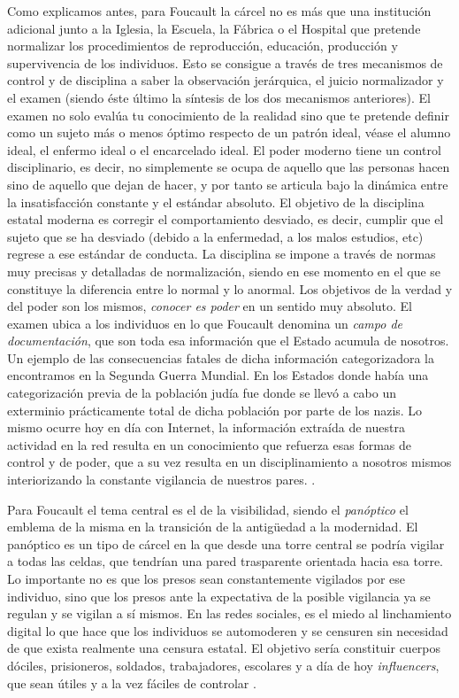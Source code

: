 \documentclass[11pt]{article}
\begin{document}
Como explicamos antes, para Foucault la cárcel no es más que una institución adicional junto a la Iglesia, la Escuela, la Fábrica o el Hospital que pretende normalizar los procedimientos de reproducción, educación, producción y supervivencia de los individuos. Esto se consigue a través de tres mecanismos de control y de disciplina a saber la observación jerárquica, el juicio normalizador y el examen (siendo éste último la síntesis de los dos mecanismos anteriores). El examen no solo evalúa tu conocimiento de la realidad sino que te pretende definir como un sujeto más o menos óptimo respecto de un patrón ideal, véase el alumno ideal, el enfermo ideal o el encarcelado ideal. El poder moderno tiene un control disciplinario, es decir, no simplemente se ocupa de aquello que las personas hacen sino de aquello que dejan de hacer, y por tanto se articula bajo la dinámica entre la insatisfacción constante y el estándar absoluto. El objetivo de la disciplina estatal moderna es corregir el comportamiento desviado, es decir, cumplir que el sujeto que se ha desviado (debido a la enfermedad, a los malos estudios, etc) regrese a ese estándar de conducta. La disciplina se impone a través de normas muy precisas y detalladas de normalización, siendo en ese momento en el que se constituye la diferencia entre lo normal y lo anormal. Los objetivos de la verdad y del poder son los mismos, \textit{conocer es poder} en un sentido muy absoluto. El examen ubica a los individuos en lo que Foucault denomina un \textit{campo de documentación}, que son toda esa información que el Estado acumula de nosotros. Un ejemplo de las consecuencias fatales de dicha información categorizadora la encontramos en la Segunda Guerra Mundial. En los Estados donde había una categorización previa de la población judía fue donde se llevó a cabo un exterminio prácticamente total de dicha población por parte de los nazis. Lo mismo ocurre hoy en día con Internet, la información extraída de nuestra actividad en la red resulta en un conocimiento que refuerza esas formas de control y de poder, que a su vez resulta en un disciplinamiento a nosotros mismos interiorizando la constante vigilancia de nuestros pares. \cite{ernesto-foucault}.

Para Foucault el tema central es el de la visibilidad, siendo el \textit{panóptico} el emblema de la misma en la transición de la antigüedad a la modernidad. El panóptico es un tipo de cárcel en la que desde una torre central se podría vigilar a todas las celdas, que tendrían una pared trasparente orientada hacia esa torre. Lo importante no es que los presos sean constantemente vigilados por ese individuo, sino que los presos ante la expectativa de la posible vigilancia ya se regulan y se vigilan a sí mismos. En las redes sociales, es el miedo al linchamiento digital lo que hace que los individuos se automoderen y se censuren sin necesidad de que exista realmente una censura estatal. El objetivo sería constituir cuerpos dóciles, prisioneros, soldados, trabajadores, escolares y a día de hoy \textit{influencers}, que sean útiles y a la vez fáciles de controlar \cite{ernesto-foucault}.
\end{document}
